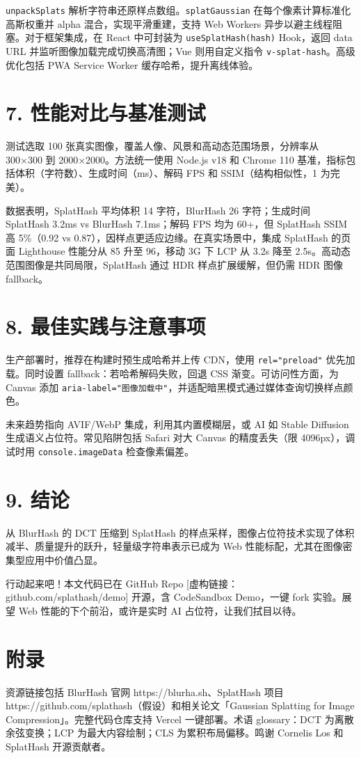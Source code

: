 \texttt{unpackSplats} 解析字符串还原样点数组。\texttt{splatGaussian} 在每个像素计算标准化高斯权重并 alpha 混合，实现平滑重建，支持 Web Workers 异步以避主线程阻塞。对于框架集成，在 React 中可封装为 \texttt{useSplatHash(hash)} Hook，返回 data URL 并监听图像加载完成切换高清图；Vue 则用自定义指令 \texttt{v-splat-hash}。高级优化包括 PWA Service Worker 缓存哈希，提升离线体验。\par
\chapter{7. 性能对比与基准测试}
测试选取 100 张真实图像，覆盖人像、风景和高动态范围场景，分辨率从 300×300 到 2000×2000。方法统一使用 Node.js v18 和 Chrome 110 基准，指标包括体积（字符数）、生成时间（ms）、解码 FPS 和 SSIM（结构相似性，1 为完美）。\par
数据表明，SplatHash 平均体积 14 字符，BlurHash 26 字符；生成时间 SplatHash 3.2ms vs BlurHash 7.1ms；解码 FPS 均为 60+，但 SplatHash SSIM 高 5\%{}（0.92 vs 0.87），因样点更适应边缘。在真实场景中，集成 SplatHash 的页面 Lighthouse 性能分从 85 升至 96，移动 3G 下 LCP 从 3.2s 降至 2.5s。高动态范围图像是共同局限，SplatHash 通过 HDR 样点扩展缓解，但仍需 HDR 图像 fallback。\par
\chapter{8. 最佳实践与注意事项}
生产部署时，推荐在构建时预生成哈希并上传 CDN，使用 \texttt{rel="preload"} 优先加载。同时设置 fallback：若哈希解码失败，回退 CSS 渐变。可访问性方面，为 Canvas 添加 \texttt{aria-label="图像加载中"}，并适配暗黑模式通过媒体查询切换样点颜色。\par
未来趋势指向 AVIF/WebP 集成，利用其内置模糊层，或 AI 如 Stable Diffusion 生成语义占位符。常见陷阱包括 Safari 对大 Canvas 的精度丢失（限 4096px），调试时用 \texttt{console.imageData} 检查像素偏差。\par
\chapter{9. 结论}
从 BlurHash 的 DCT 压缩到 SplatHash 的样点采样，图像占位符技术实现了体积减半、质量提升的跃升，轻量级字符串表示已成为 Web 性能标配，尤其在图像密集型应用中价值凸显。\par
行动起来吧！本文代码已在 GitHub Repo [虚构链接：github.com/splathash/demo] 开源，含 CodeSandbox Demo，一键 fork 实验。展望 Web 性能的下个前沿，或许是实时 AI 占位符，让我们拭目以待。\par
\chapter{附录}
资源链接包括 BlurHash 官网 https://blurha.sh、SplatHash 项目 https://github.com/splathash（假设）和相关论文「Gaussian Splatting for Image Compression」。完整代码仓库支持 Vercel 一键部署。术语 glossary：DCT 为离散余弦变换；LCP 为最大内容绘制；CLS 为累积布局偏移。鸣谢 Cornelis Los 和 SplatHash 开源贡献者。\par
